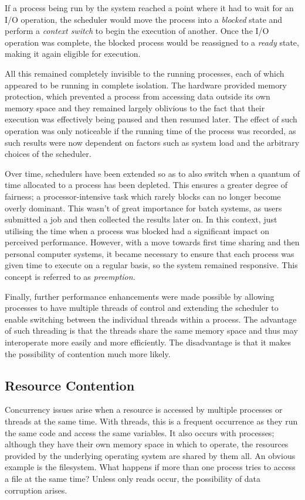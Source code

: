 If a process being run by the system reached a point where it had to
wait for an I/O operation, the scheduler would move the process into a
\emph{blocked} state and perform a \emph{context switch} to begin the
execution of another.  Once the I/O operation was complete, the
blocked process would be reassigned to a \emph{ready} state, making it
again eligible for execution.

All this remained completely invisible to the running processes, each
of which appeared to be running in complete isolation.  The hardware
provided memory protection, which prevented a process from accessing
data outside its own memory space and they remained largely oblivious
to the fact that their execution was effectively being paused and then
resumed later.  The effect of such operation was only noticeable if
the running time of the process was recorded, as such results were now
dependent on factors such as system load and the arbitrary choices of
the scheduler.

Over time, schedulers have been extended so as to also switch when a
quantum of time allocated to a process has been depleted.  This
ensures a greater degree of fairness; a processor-intensive task which
rarely blocks can no longer become overly dominant.  This wasn't of
great importance for batch systems, as users submitted a job and then
collected the results later on.  In this context, just utilising the
time when a process was blocked had a significant impact on perceived
performance.  However, with a move towards first time sharing and then
personal computer systems, it became necessary to ensure that each
process was given time to execute on a regular basis, so the system
remained responsive.  This concept is referred to as
\emph{preemption}.

Finally, further performance enhancements were made possible by
allowing processes to have multiple threads of control and extending
the scheduler to enable switching between the individual threads
within a process.  The advantage of such threading is that the threads
share the same memory space and thus may interoperate more easily and
more efficiently.  The disadvantage is that it makes the possibility
of contention much more likely.

\subsection{Resource Contention}

Concurrency issues arise when a resource is accessed by multiple
processes or threads at the same time.  With threads, this is a
frequent occurrence as they run the same code and access the same
variables.  It also occurs with processes; although they have their
own memory space in which to operate, the resources provided by the
underlying operating system are shared by them all.  An obvious
example is the filesystem.  What happens if more than one process
tries to access a file at the same time?  Unless only reads occur, the
possibility of data corruption arises.


